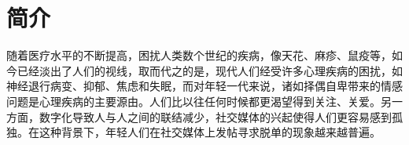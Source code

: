 
\chapter{简介}
随着医疗水平的不断提高，困扰人类数个世纪的疾病，像天花、麻疹、鼠疫等，如今已经淡出了人们的视线，取而代之的是，现代人们经受许多心理疾病的困扰，如神经退行病变、抑郁、焦虑和失眠，而对年轻一代来说，诸如择偶自卑带来的情感问题是心理疾病的主要源由\cite{chen2022nong}。人们比以往任何时候都更渴望得到关注、关爱\cite{zhang2019gao}。另一方面，数字化导致人与人之间的联结减少，社交媒体的兴起使得人们更容易感到孤独。在这种背景下，年轻人们在社交媒体上发帖寻求脱单的现象越来越普遍。